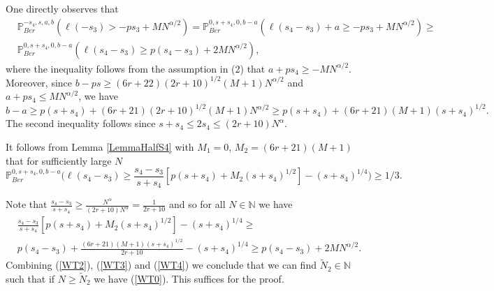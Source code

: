 One directly observes that
\begin{equation}\label{WT2}
\begin{split}
&\mathbb{P}^{-s_4,s,a,b}_{Ber}\left( \ell(-s_3) > -ps_3 + MN^{\alpha/2}\right) = \mathbb{P}^{0,s+s_4,0,b-a}_{Ber}\left(\ell(s_4-s_3) + a \geq -ps_3 + MN^{\alpha/2}\right) \geq\\
& \mathbb{P}^{0,s+s_4,0,b-a}_{Ber}\left(\ell(s_4-s_3) \geq p(s_4-s_3) + 2MN^{\alpha/2}\right),
\end{split}
\end{equation}
where the inequality follows from the assumption in (2) that $a+ps_4 \geq -MN^{\alpha/2}$. Moreover, since $b-ps \geq (6r+22)(2r+10)^{1/2}(M+1)N^{\alpha/2}$ and $a+ps_4 \leq MN^{\alpha/2}$, we have 
$$b-a \geq p(s+s_4) + (6r+21)(2r+10)^{1/2}(M+1)N^{\alpha/2} \geq p(s+s_4) + (6r+21)(M+1)(s+s_4)^{1/2}.$$
The second inequality follows since $s+s_4 \leq 2s_4 \leq (2r+10)N^{\alpha}$. 

It follows from Lemma \ref{LemmaHalfS4} with $M_1 = 0$, $M_2 = (6r+21)(M+1)$ that for sufficiently large $N$
\begin{equation}\label{WT3}
\mathbb{P}^{0,s+s_4,0,b-a}_{Ber}\Big(\ell(s_4-s_3) \geq \frac{s_4-s_3}{s+s_4}[p(s+s_4) + M_2 (s+s_4)^{1/2}] - (s+s_4)^{1/4}\Big) \geq 1/3.
\end{equation}

Note that $\frac{s_4-s_3}{s+s_4} \geq \frac{N^\alpha }{(2r+10)N^\alpha} = \frac{1}{2r+10}$ and so for all $N \in \mathbb{N}$ we have
\begin{equation}\label{WT4}
\begin{split}
& \frac{s_4-s_3}{s+s_4}[p(s+s_4) + M_2 (s+s_4)^{1/2}] - (s+s_4)^{1/4} \geq \\
& p(s_4-s_3) + \frac{(6r+21)(M+1) (s+s_4)^{1/2}}{2r+10}  - (s+s_4)^{1/4} \geq p(s_4-s_3) + 2MN^{\alpha/2}.
\end{split}
\end{equation}
Combining (\ref{WT2}), (\ref{WT3}) and (\ref{WT4}) we conclude that we can find $\tilde{N}_2 \in \mathbb{N}$ such that if $N \geq \tilde{N}_2$ we have (\ref{WT0}). This suffices for the proof.


%
